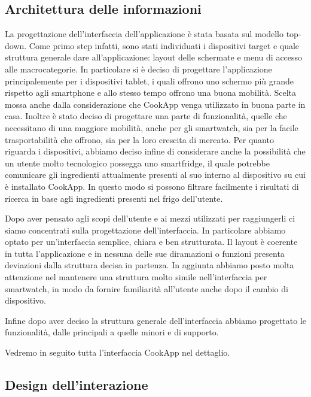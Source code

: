 \subsection{Architettura delle informazioni}
La progettazione dell'interfaccia dell'applicazione è stata basata sul
modello top-down. Come primo step infatti, sono stati individuati i
dispositivi target e quale
struttura generale dare all'applicazione: layout delle schermate e menu di accesso
alle macrocategorie. In particolare si è deciso
di progettare l'applicazione principalemente per i dispositivi tablet, i
quali offrono uno schermo più grande rispetto agli smartphone e allo
stesso tempo offrono una buona mobilità. Scelta mossa anche dalla
considerazione che CookApp venga utilizzato in buona parte in
casa. Inoltre è stato deciso di progettare una parte di
funzionalità, quelle che necessitano di una maggiore mobilità,  anche
per gli smartwatch, sia per la facile trasportabilità che
offrono, sia per la loro crescita di mercato. Per quanto riguarda i
dispositivi, abbiamo deciso infine di considerare anche la possibilità
che un utente molto tecnologico possegga uno smartfridge, il quale
potrebbe comunicare gli ingredienti attualmente presenti al suo interno
al dispositivo su cui è installato CookApp. In questo modo si possono
filtrare facilmente i risultati di ricerca in base agli ingredienti
presenti nel frigo dell'utente.

Dopo aver pensato agli scopi dell'utente e ai mezzi utilizzati per
raggiungerli ci siamo concentrati sulla progettazione dell'interfaccia.
In particolare abbiamo optato per un'interfaccia semplice, chiara e ben
strutturata. Il layout è coerente in tutta l'applicazione e in nessuna
delle
sue diramazioni o funzioni presenta deviazioni dalla struttura decisa in
partenza. In aggiunta abbiamo posto molta attenzione nel mantenere una
struttura molto simile nell'interfaccia per smartwatch, in modo da
fornire familiarità all'utente anche dopo il cambio di dispositivo.

Infine dopo aver deciso la struttura generale dell'interfaccia abbiamo
progettato le funzionalità, dalle principali a quelle minori e di
supporto.

Vedremo in seguito tutta l'interfaccia
CookApp nel dettaglio.

\subsection{Design dell'interazione}

